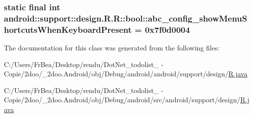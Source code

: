 \hypertarget{classandroid_1_1support_1_1design_1_1_r_1_1bool_0149501b311f4896354a8685e45e32ea}{
\subsubsection[{abc\_\-config\_\-showMenuShortcutsWhenKeyboardPresent}]{\setlength{\rightskip}{0pt plus 5cm}static final int android::support::design.R.R::bool::abc\_\-config\_\-showMenuShortcutsWhenKeyboardPresent = 0x7f0d0004}}
\label{classandroid_1_1support_1_1design_1_1_r_1_1bool_0149501b311f4896354a8685e45e32ea}




The documentation for this class was generated from the following files:\begin{CompactItemize}
\item 
C:/Users/FrBea/Desktop/rendu/DotNet\_\-todolist\_ - Copie/2doo/\_\-2doo.Android/obj/Debug/android/android/support/design/\hyperlink{android_2support_2design_2_r_8java}{R.java}\item 
C:/Users/FrBea/Desktop/rendu/DotNet\_\-todolist\_ - Copie/2doo/\_\-2doo.Android/obj/Debug/android/src/android/support/design/\hyperlink{src_2android_2support_2design_2_r_8java}{R.java}\end{CompactItemize}
